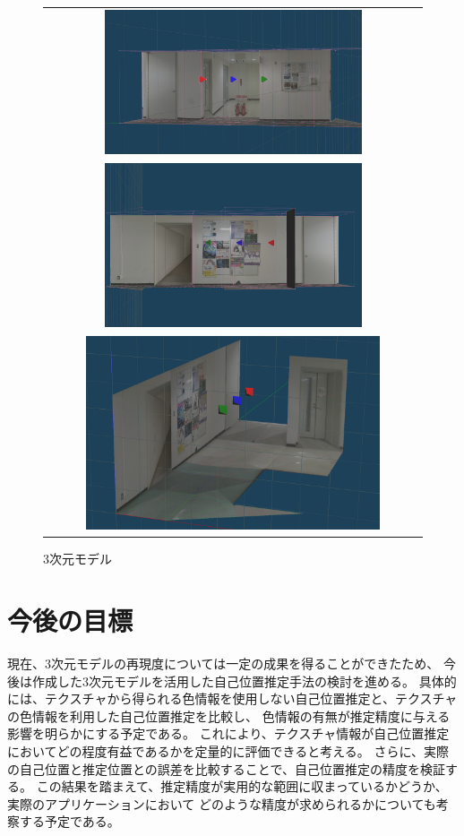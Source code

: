 \documentclass[]{jarticle}          %
\begin{document}
\begin{figure}[H]
  \begin{center}
    \begin{tabular}{c}
      \includegraphics[width=0.7\textwidth]{figures/2.png}\\
      \includegraphics[width=0.7\textwidth]{figures/3.png}\\
      \includegraphics[width=0.8\textwidth]{figures/4.png}\\
    \end{tabular}
  \end{center}
  \caption{3次元モデル}
  \label{six}
\end{figure}

\section{今後の目標}
現在、3次元モデルの再現度については一定の成果を得ることができたため、
今後は作成した3次元モデルを活用した自己位置推定手法の検討を進める。
具体的には、テクスチャから得られる色情報を使用しない自己位置推定と、テクスチャの色情報を利用した自己位置推定を比較し、
色情報の有無が推定精度に与える影響を明らかにする予定である。
これにより、テクスチャ情報が自己位置推定においてどの程度有益であるかを定量的に評価できると考える。
さらに、実際の自己位置と推定位置との誤差を比較することで、自己位置推定の精度を検証する。
この結果を踏まえて、推定精度が実用的な範囲に収まっているかどうか、実際のアプリケーションにおいて
どのような精度が求められるかについても考察する予定である。
\end{document}
